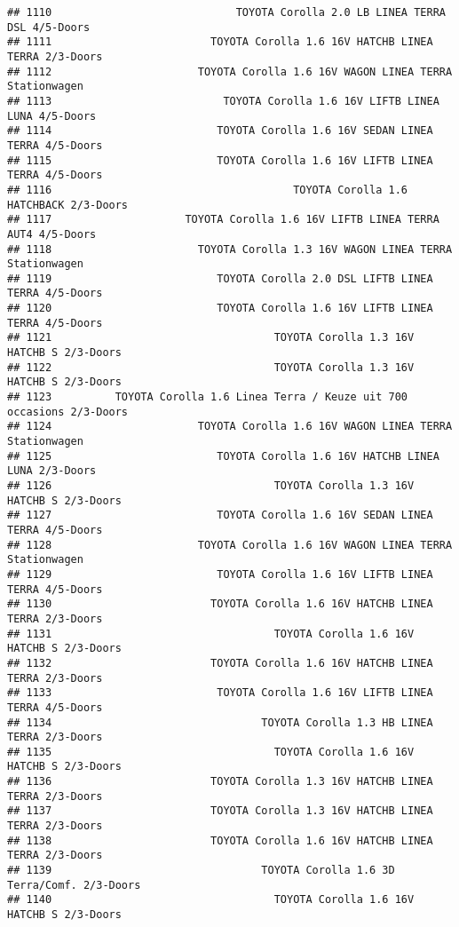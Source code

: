 \documentclass[]{article}
\begin{document}
\begin{verbatim}
## 1110                             TOYOTA Corolla 2.0 LB LINEA TERRA DSL 4/5-Doors
## 1111                         TOYOTA Corolla 1.6 16V HATCHB LINEA TERRA 2/3-Doors
## 1112                       TOYOTA Corolla 1.6 16V WAGON LINEA TERRA Stationwagen
## 1113                           TOYOTA Corolla 1.6 16V LIFTB LINEA LUNA 4/5-Doors
## 1114                          TOYOTA Corolla 1.6 16V SEDAN LINEA TERRA 4/5-Doors
## 1115                          TOYOTA Corolla 1.6 16V LIFTB LINEA TERRA 4/5-Doors
## 1116                                      TOYOTA Corolla 1.6 HATCHBACK 2/3-Doors
## 1117                     TOYOTA Corolla 1.6 16V LIFTB LINEA TERRA AUT4 4/5-Doors
## 1118                       TOYOTA Corolla 1.3 16V WAGON LINEA TERRA Stationwagen
## 1119                          TOYOTA Corolla 2.0 DSL LIFTB LINEA TERRA 4/5-Doors
## 1120                          TOYOTA Corolla 1.6 16V LIFTB LINEA TERRA 4/5-Doors
## 1121                                   TOYOTA Corolla 1.3 16V HATCHB S 2/3-Doors
## 1122                                   TOYOTA Corolla 1.3 16V HATCHB S 2/3-Doors
## 1123          TOYOTA Corolla 1.6 Linea Terra / Keuze uit 700 occasions 2/3-Doors
## 1124                       TOYOTA Corolla 1.6 16V WAGON LINEA TERRA Stationwagen
## 1125                          TOYOTA Corolla 1.6 16V HATCHB LINEA LUNA 2/3-Doors
## 1126                                   TOYOTA Corolla 1.3 16V HATCHB S 2/3-Doors
## 1127                          TOYOTA Corolla 1.6 16V SEDAN LINEA TERRA 4/5-Doors
## 1128                       TOYOTA Corolla 1.6 16V WAGON LINEA TERRA Stationwagen
## 1129                          TOYOTA Corolla 1.6 16V LIFTB LINEA TERRA 4/5-Doors
## 1130                         TOYOTA Corolla 1.6 16V HATCHB LINEA TERRA 2/3-Doors
## 1131                                   TOYOTA Corolla 1.6 16V HATCHB S 2/3-Doors
## 1132                         TOYOTA Corolla 1.6 16V HATCHB LINEA TERRA 2/3-Doors
## 1133                          TOYOTA Corolla 1.6 16V LIFTB LINEA TERRA 4/5-Doors
## 1134                                 TOYOTA Corolla 1.3 HB LINEA TERRA 2/3-Doors
## 1135                                   TOYOTA Corolla 1.6 16V HATCHB S 2/3-Doors
## 1136                         TOYOTA Corolla 1.3 16V HATCHB LINEA TERRA 2/3-Doors
## 1137                         TOYOTA Corolla 1.3 16V HATCHB LINEA TERRA 2/3-Doors
## 1138                         TOYOTA Corolla 1.6 16V HATCHB LINEA TERRA 2/3-Doors
## 1139                                 TOYOTA Corolla 1.6 3D Terra/Comf. 2/3-Doors
## 1140                                   TOYOTA Corolla 1.6 16V HATCHB S 2/3-Doors

\end{verbatim}
\end{document}
